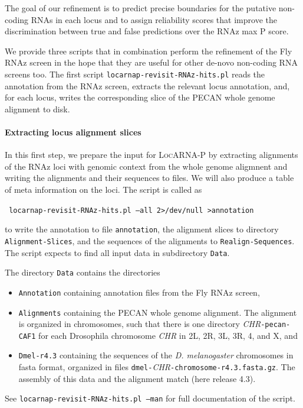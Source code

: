\documentclass{article}
\newcommand{\LocARNAP}{\textsc{LocARNA-P}}
\newenvironment{ttbox}{%
  \begin{framed}\begin{minipage}{1.0\textwidth}\tt}%
{\end{minipage}\end{framed}\noindent}
\begin{document}
The goal of our refinement is to predict precise boundaries for the
putative non-coding RNAs in each locus and to assign reliability
scores that improve the discrimination between true and false
predictions over the RNAz max P score.

We provide three scripts that in combination perform the refinement of
the Fly RNAz screen in the hope that they are useful for other de-novo
non-coding RNA screens too. The first script
\texttt{locarnap-revisit-RNAz-hits.pl} reads the annotation from the RNAz
screen, extracts the relevant locus annotation, and, for each locus,
writes the corresponding slice of the PECAN whole genome alignment to
disk.

\paragraph{Extracting locus alignment slices}
In this first step, we prepare the input for \LocARNAP{} by extracting
alignments of the RNAz loci with genomic context from the whole genome
aligmnent and writing the alignments and their sequences to files. We
will also produce a table of meta information on the loci. The script
is called as
\begin{ttbox}
  locarnap-revisit-RNAz-hits.pl --all 2>/dev/null >annotation
\end{ttbox}
to write the annotation to file \texttt{annotation}, the alignment
slices to directory \texttt{Alignment-Slices}, and the sequences of
the alignments to \texttt{Realign-Sequences}. The script expects to
find all input data in subdirectory \texttt{Data}.

The directory \texttt{Data} contains the directories
\begin{itemize}
\item \texttt{Annotation} containing annotation files from the Fly RNAz screen, 
\item \texttt{Alignments} containing the PECAN whole genome
  alignment. The alignment is organized in chromosomes, such that
  there is one directory \emph{CHR}\texttt{-pecan-CAF1} for each
  Drosophila chromosome \emph{CHR} in 2L, 2R, 3L, 3R, 4, and X, and
\item \texttt{Dmel-r4.3} containing the sequences of the
  \emph{D. melanogaster} chromosomes in fasta format, organized in
  files
  \texttt{dmel-}\emph{CHR}\texttt{-chromosome-r4.3.fasta.gz}. The
  assembly of this data and the alignment match (here release 4.3).
\end{itemize}
%
See \texttt{locarnap-revisit-RNAz-hits.pl --man} for full documentation of the
script.
\end{document}
